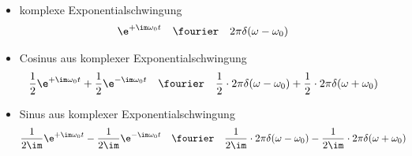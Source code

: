 \begin{itemize}
\item komplexe Exponentialschwingung
\begin{align}
\e^{+\im\omega_0 t} &\quad \fourier \quad 2\pi\delta(\omega - \omega_0)
\end{align}

\item Cosinus aus komplexer Exponentialschwingung
\begin{align}
\frac{1}{2} \e^{+\im\omega_0 t} + \frac{1}{2}  \e^{-\im\omega_0 t} &\quad \fourier \quad \frac{1}{2} \cdot 2\pi\delta(\omega -\omega_0) +\frac{1}{2} \cdot 2\pi\delta(\omega + \omega_0)
\end{align}

\item Sinus aus komplexer Exponentialschwingung
\begin{align}
\frac{1}{2\im} \e^{+\im\omega_0 t} - \frac{1}{2\im}  \e^{-\im\omega_0 t} &\quad \fourier \quad \frac{1}{2\im} \cdot 2\pi\delta(\omega -\omega_0) - \frac{1}{2\im} \cdot 2\pi\delta(\omega + \omega_0)
\end{align}
\end{itemize}




